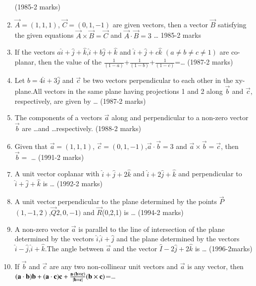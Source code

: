 \documentclass[journal]{IEEEtran}
\numberwithin{equation}{enumi}
\numberwithin{figure}{enumi}
\begin{document}
\begin{enumerate}
\hfill{(1985-2 marks)}
\item $\vec{A}=(1,1,1)$, $\vec{C}=(0,1,-1)$ are given vectors, then a vector $\vec{B}$ satisfying the given equations $\vec{A}\times\vec{B}=\vec{C}$ and $\vec{A}\cdot\vec{B}=3$ \dots
\hfill{1985-2 marks}
\item If the vectors $a\hat{i}+\hat{j}+\hat{k}$,$\hat{i}+b\hat{j}+\hat{k}$ and $\hat{i}+\hat{j}+c\hat{k}$ $(a\neq b\neq c\neq 1)$ are co-planar, then the value of the $\frac{1}{(1-a)}$+$\frac{1}{(1-b)}$+$\frac{1}{(1-c)}$=\dots
\hfill{(1987-2 marks)}
\item Let $b=4\hat{i}+3\hat{j}$ and $\vec{c}$ be two vectors perpendicular to each other in the xy-plane.All vectors in the same plane having projections 1 and 2 along $\vec{b}$ and $\vec{c}$, respectively, are given by \dots
\hfill{(1987-2 marks)}
\item The components of a vectors $\vec{a}$ along and  perpendicular to a non-zero vector $\vec{b}$ are \dots and \dots respectively.
\hfill{(1988-2 marks)}
\item Given that $\vec{a}=(1,1,1)$, $\vec{c}=(0,1,-1)$,$\vec{a}\cdot\vec{b}=3$ and $\vec{a}\times\vec{b}=\vec{c}$, then $\vec{b}=$ \dots
\hfill{(1991-2 marks)}
\item A unit vector coplanar with $\hat{i}+\hat{j}+2\hat{k}$ and $\hat{i}+2\hat{j}+\hat{k}$ and perpendicular to $\hat{i}+\hat{j}+\hat{k}$ is \dots
\hfill{(1992-2 marks)}
\item A unit vector perpendicular to the plane determined by the points $\vec{P}$$(1,-1,2)$,$\vec{Q}2,0,-1)$ and $\vec{R}$(0,2,1) is \dots
\hfill{(1994-2 marks)}
\item A non-zero vector $\vec{a}$ is parallel to the line of intersection of the plane determined by the vectors $\hat{i}$,$\hat{i}+\hat{j}$ and the plane determined by the vectors $\hat{i}-\hat{j}$,$\hat{i}+\hat{k}$.The angle between $\vec{a}$ and the vector $\hat{I}-2\hat{j}+2\hat{k}$ is \dots
\hfill{(1996-2marks)}
\item If $\vec{b}$ and $\vec{c}$ are any two non-collinear unit vectors and $\vec{a}$ is any vector, then $(\mathbf{a}\cdot\mathbf{b})\mathbf{b}+(\mathbf{a}\cdot\mathbf{c})\mathbf{c}+\frac{\mathbf{a}\cdot(\mathbf{b}\times\mathbf{c})}{\left\vert\mathbf{b}\times\mathbf{c}\right\vert}(\mathbf{b}\times\mathbf{c})$=\dots

\end{enumerate}
\end{document}
